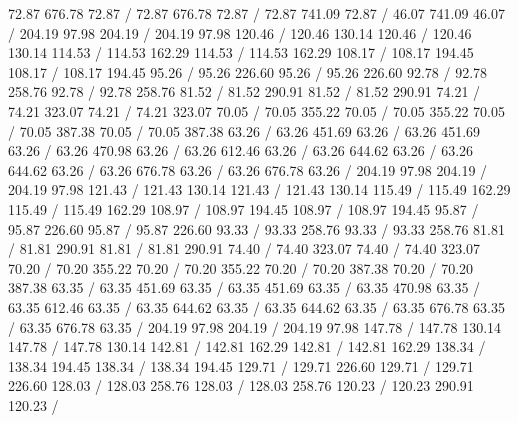 { 72.87 676.78 72.87 /
 72.87 676.78 72.87 /
 72.87 741.09 72.87 /
 46.07 741.09 46.07 /
\setdashpattern <4pt, 4pt>
 204.19 97.98 204.19 /
 204.19 97.98 120.46 /
 120.46 130.14 120.46 /
 120.46 130.14 114.53 /
 114.53 162.29 114.53 /
 114.53 162.29 108.17 /
 108.17 194.45 108.17 /
 108.17 194.45 95.26 /
 95.26 226.60 95.26 /
 95.26 226.60 92.78 /
 92.78 258.76 92.78 /
 92.78 258.76 81.52 /
 81.52 290.91 81.52 /
 81.52 290.91 74.21 /
 74.21 323.07 74.21 /
 74.21 323.07 70.05 /
 70.05 355.22 70.05 /
 70.05 355.22 70.05 /
 70.05 387.38 70.05 /
 70.05 387.38 63.26 /
 63.26 451.69 63.26 /
 63.26 451.69 63.26 /
 63.26 470.98 63.26 /
 63.26 612.46 63.26 /
 63.26 644.62 63.26 /
 63.26 644.62 63.26 /
 63.26 676.78 63.26 /
 63.26 676.78 63.26 /
\setdashpattern <1pt, 3pt>
 204.19 97.98 204.19 /
 204.19 97.98 121.43 /
 121.43 130.14 121.43 /
 121.43 130.14 115.49 /
 115.49 162.29 115.49 /
 115.49 162.29 108.97 /
 108.97 194.45 108.97 /
 108.97 194.45 95.87 /
 95.87 226.60 95.87 /
 95.87 226.60 93.33 /
 93.33 258.76 93.33 /
 93.33 258.76 81.81 /
 81.81 290.91 81.81 /
 81.81 290.91 74.40 /
 74.40 323.07 74.40 /
 74.40 323.07 70.20 /
 70.20 355.22 70.20 /
 70.20 355.22 70.20 /
 70.20 387.38 70.20 /
 70.20 387.38 63.35 /
 63.35 451.69 63.35 /
 63.35 451.69 63.35 /
 63.35 470.98 63.35 /
 63.35 612.46 63.35 /
 63.35 644.62 63.35 /
 63.35 644.62 63.35 /
 63.35 676.78 63.35 /
 63.35 676.78 63.35 /
\setdashpattern <4pt, 4pt>
 204.19 97.98 204.19 /
 204.19 97.98 147.78 /
 147.78 130.14 147.78 /
 147.78 130.14 142.81 /
 142.81 162.29 142.81 /
 142.81 162.29 138.34 /
 138.34 194.45 138.34 /
 138.34 194.45 129.71 /
 129.71 226.60 129.71 /
 129.71 226.60 128.03 /
 128.03 258.76 128.03 /
 128.03 258.76 120.23 /
 120.23 290.91 120.23 /
}
